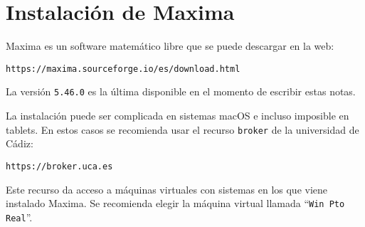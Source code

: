 
\section*{Instalación de Maxima}
Maxima es un software matemático libre
que se puede descargar en la web:
\begin{center}
\verb|https://maxima.sourceforge.io/es/download.html|
\end{center}
La versión \texttt{5.46.0} es la última disponible
en el momento de escribir estas notas.

La instalación puede ser complicada en sistemas macOS e
incluso imposible en tablets.
En estos casos se recomienda usar el recurso \texttt{broker}
de la universidad de Cádiz:
\begin{center}
\verb|https://broker.uca.es|
\end{center}
Este recurso da acceso a máquinas virtuales con sistemas
en los que viene instalado Maxima.
Se recomienda elegir la máquina virtual llamada
``\texttt{Win Pto Real}''.
